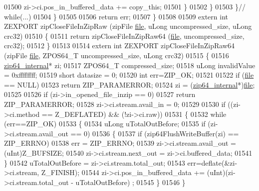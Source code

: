 \begin{DoxyCode}
01500                   zi->ci.pos\_in\_buffered\_data += copy\_this;
01501               \}
01502           \}
01503       \}\textcolor{comment}{// while(...)}
01504     \}
01505 
01506     \textcolor{keywordflow}{return} err;
01507 \}
01508 
01509 \textcolor{keyword}{extern} \textcolor{keywordtype}{int} ZEXPORT zipCloseFileInZipRaw (zipFile \hyperlink{structfile}{file}, uLong uncompressed\_size, uLong crc32)
01510 \{
01511     \textcolor{keywordflow}{return} zipCloseFileInZipRaw64 (\hyperlink{structfile}{file}, uncompressed\_size, crc32);
01512 \}
01513 
01514 \textcolor{keyword}{extern} \textcolor{keywordtype}{int} ZEXPORT zipCloseFileInZipRaw64 (zipFile \hyperlink{structfile}{file}, ZPOS64\_T uncompressed\_size, uLong crc32)
01515 \{
01516     \hyperlink{structzip64__internal}{zip64\_internal}* zi;
01517     ZPOS64\_T compressed\_size;
01518     uLong invalidValue = 0xffffffff;
01519     \textcolor{keywordtype}{short} datasize = 0;
01520     \textcolor{keywordtype}{int} err=ZIP\_OK;
01521 
01522     \textcolor{keywordflow}{if} (\hyperlink{structfile}{file} == NULL)
01523         \textcolor{keywordflow}{return} ZIP\_PARAMERROR;
01524     zi = (\hyperlink{structzip64__internal}{zip64\_internal}*)\hyperlink{structfile}{file};
01525 
01526     \textcolor{keywordflow}{if} (zi->in\_opened\_file\_inzip == 0)
01527         \textcolor{keywordflow}{return} ZIP\_PARAMERROR;
01528     zi->ci.stream.avail\_in = 0;
01529 
01530     \textcolor{keywordflow}{if} ((zi->ci.method == Z\_DEFLATED) && (!zi->ci.raw))
01531                 \{
01532                         \textcolor{keywordflow}{while} (err==ZIP\_OK)
01533                         \{
01534                                 uLong uTotalOutBefore;
01535                                 \textcolor{keywordflow}{if} (zi->ci.stream.avail\_out == 0)
01536                                 \{
01537                                         \textcolor{keywordflow}{if} (zip64FlushWriteBuffer(zi) == ZIP\_ERRNO)
01538                                                 err = ZIP\_ERRNO;
01539                                         zi->ci.stream.avail\_out = (uInt)Z\_BUFSIZE;
01540                                         zi->ci.stream.next\_out = zi->ci.buffered\_data;
01541                                 \}
01542                                 uTotalOutBefore = zi->ci.stream.total\_out;
01543                                 err=deflate(&zi->ci.stream,  Z\_FINISH);
01544                                 zi->ci.pos\_in\_buffered\_data += (uInt)(zi->ci.stream.total\_out - 
      uTotalOutBefore) ;
01545                         \}
01546                 \}

\end{DoxyCode}
